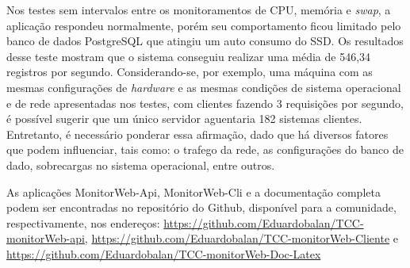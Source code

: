 Nos testes sem intervalos entre os monitoramentos de CPU, memória e \textit{swap}, a aplicação respondeu normalmente, porém seu comportamento ficou limitado pelo banco de dados PostgreSQL que atingiu um auto consumo do SSD. Os resultados desse teste mostram que o sistema conseguiu realizar uma média de 546,34 registros por segundo. Considerando-se, por exemplo, uma máquina com as mesmas configurações de \textit{hardware} e as mesmas condições de sistema operacional e de rede apresentadas nos testes, com clientes fazendo 3 requisições por segundo, é possível sugerir que um único servidor aguentaria 182 sistemas clientes. Entretanto, é necessário ponderar essa afirmação, dado que há diversos fatores que podem influenciar, tais como: o trafego da rede, as configurações do banco de dado, sobrecargas no sistema operacional, entre outros.
 
As aplicações MonitorWeb-Api, MonitorWeb-Cli e a documentação completa podem ser encontradas no repositório do Github, disponível para a comunidade, respectivamente, nos endereços: \url{https://github.com/Eduardobalan/TCC-monitorWeb-api}, \url{https://github.com/Eduardobalan/TCC-monitorWeb-Cliente}  e  \url{https://github.com/Eduardobalan/TCC-monitorWeb-Doc-Latex}

